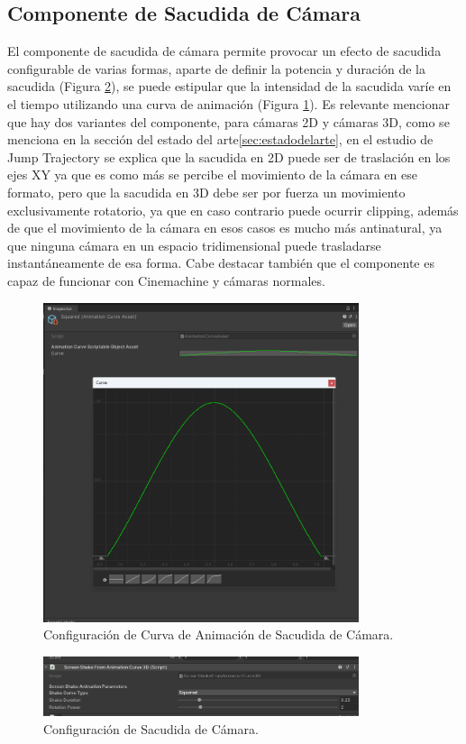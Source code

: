 \subsection{Componente de Sacudida de Cámara}
El componente de sacudida de cámara permite provocar un efecto de sacudida configurable de varias formas, aparte de definir la potencia y duración de la sacudida (Figura \ref{fig:screenshake2}), se puede 
estipular que la intensidad de la sacudida varíe en el tiempo utilizando una curva de animación (Figura \ref{fig:screenshake1}). Es relevante mencionar que hay dos variantes del componente, para cámaras 2D y 
cámaras 3D, como se menciona en la sección del estado del arte\ref{sec:estadodelarte}, en el estudio de Jump Trajectory\cite{Screenshake} se explica que la sacudida en 2D puede 
ser de traslación en los ejes XY ya que es como más se percibe el movimiento de la cámara en ese formato, pero que la sacudida en 3D debe ser por fuerza un movimiento 
exclusivamente rotatorio, ya que en caso contrario puede ocurrir clipping, además de que el movimiento de la cámara en esos casos es mucho más antinatural, ya que ninguna cámara
 en un espacio tridimensional puede trasladarse instantáneamente de esa forma. Cabe destacar también que el componente es capaz de funcionar con Cinemachine y cámaras normales. 

 
 \begin{figure}[H]
    \centering
    \includegraphics[width=350px,clip=true]{screenshakecurve.png}
    \caption{Configuración de Curva de Animación de Sacudida de Cámara.}
    \label{fig:screenshake1}
\end{figure}

\begin{figure}[H]
  \centering
    \includegraphics[width=350px,clip=true]{screenshake2.png}
  \caption{Configuración de Sacudida de Cámara.}
  \label{fig:screenshake2}
\end{figure}


